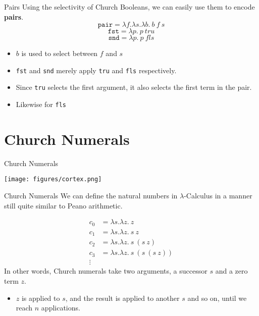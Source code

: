 \documentclass[11pt]{beamer}
\begin{document}
\begin{frame}[fragile=singleslide]{Pairs}
Using the selectivity of Church Booleans, we can easily use them to encode \textbf{pairs}.
\begin{equation}
\texttt{pair} = \lambda f. \lambda s. \lambda b.\:b\:f\:s
\end{equation}
\begin{equation}
\texttt{fst} = \lambda p.\:p\:tru 
\end{equation}
\begin{equation}
\texttt{snd} = \lambda p.\:p\:fls 
\end{equation}
\begin{itemize}
\item $b$ is used to select between $f$ and $s$
\item \texttt{fst} and \texttt{snd} merely apply \texttt{tru} and \texttt{fls} respectively.
\item Since \texttt{tru} selects the first argument, it also selects the first term in the pair.
\item Likewise for \texttt{fls}
\end{itemize}
\end{frame}

\section[Numerals]{Church Numerals}
\begin{frame}[fragile=singleslide]{Church Numerals}
\begin{center}
\texttt{[image: figures/cortex.png]}
\end{center}
\end{frame}

\begin{frame}[fragile=singleslide]{Church Numerals}
We can define the natural numbers in $\lambda$-Calculus in a manner still quite similar to Peano arithmetic.  

\begin{align}
c_0 &= \lambda s. \lambda z.\:z \\
c_1 &= \lambda s. \lambda z.\:s\:z \\
c_2 &= \lambda s. \lambda z.\:s\:(s\:z) \\
c_3 &= \lambda s. \lambda z.\:s\:(s\:(s\:z)) \\
\vdots \nonumber
\end{align}
In other words, Church numerals take two arguments, a successor $s$ and a zero term $z$. 
\begin{itemize}
\item $z$ is applied to $s$, and the result is applied to another $s$ and so on, until we reach $n$ applications.
\end{itemize}
\end{frame}
\end{document}
